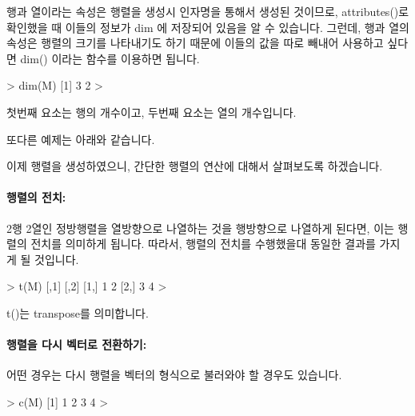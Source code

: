 행과 열이라는 속성은 행렬을 생성시 인자명을 통해서 생성된 것이므로, attributes()로 확인했을 때 이들의 정보가 dim 에 저장되어 있음을 알 수 있습니다. 
그런데, 행과 열의 속성은 행렬의 크기를 나타내기도 하기 때문에 이들의 값을 따로 빼내어 사용하고 싶다면 dim() 이라는 함수를 이용하면 됩니다. 

\begin{Schunk}
\begin{Soutput}
> dim(M)
[1] 3 2
>
\end{Soutput}
\end{Schunk}

첫번째 요소는 행의 개수이고, 두번째 요소는 열의 개수입니다. 

또다른 예제는 아래와 같습니다. 

\begin{Schunk}
\end{Schunk}

이제 행렬을 생성하였으니, 간단한 행렬의 연산에 대해서 살펴보도록 하겠습니다. 

\paragraph{행렬의 전치: }
2행 2열인 정방행렬을 열방향으로 나열하는 것을 행방향으로 나열하게 된다면, 이는 행렬의 전치를 의미하게 됩니다. 
따라서, 행렬의 전치를 수행했을대 동일한 결과를 가지게 될 것입니다. 

\begin{Schunk}
\begin{Soutput}

> t(M)
     [,1] [,2]
[1,]    1    2
[2,]    3    4
> 
\end{Soutput}
\end{Schunk}

t()는 transpose를 의미합니다.

\paragraph{행렬을 다시 벡터로 전환하기:}
어떤 경우는 다시 행렬을 벡터의 형식으로 불러와야 할 경우도 있습니다. 

\begin{Schunk}
\begin{Soutput}
> c(M)
[1] 1 2 3 4
> 
\end{Soutput}
\end{Schunk}


